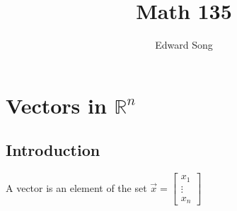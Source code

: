 \documentclass[11pt]{article}
\title{Math 135}
\author{Edward Song}
\theoremstyle{plain}
\theoremstyle{remark}
\theoremstyle{plain}
\newcommand{\rn}{\mathbb{R}}
\begin{document}
\section {Vectors in $\rn^n$}


   

\subsection{Introduction}

\begin{tcolorbox}[colback=green!5!white,colframe=green!75!black,title=Definition]
    A vector is an element of the set $\overrightarrow{x} = 
    \begin{bmatrix}
        x_1 \\\vdots\\ x_n
    \end{bmatrix}$
        
\end{tcolorbox}   
\end{document}
